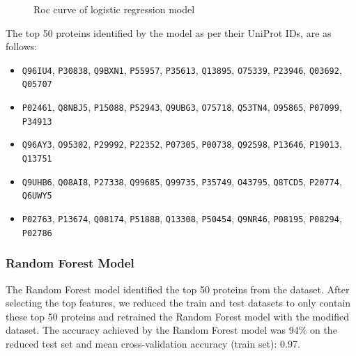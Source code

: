 \documentclass[a4paper,12pt]{article}
\begin{document}
\begin{figure}[H]
\begin{minipage}[b]{0.45\textwidth}
		\caption{Roc curve of logistic regression model}
		\label{fig:roc_curve_logreg}
	\end{minipage}
\end{figure}
The top 50 proteins identified by the model as per their UniProt IDs, are as follows:
\begin{itemize}
	\item \texttt{Q96IU4}, \texttt{P30838}, \texttt{Q9BXN1}, \texttt{P55957}, \texttt{P35613}, \texttt{Q13895}, \texttt{O75339}, \texttt{P23946}, \texttt{Q03692}, \texttt{Q05707}
	\item \texttt{P02461}, \texttt{Q8NBJ5}, \texttt{P15088}, \texttt{P52943}, \texttt{Q9UBG3}, \texttt{O75718}, \texttt{Q53TN4}, \texttt{O95865}, \texttt{P07099}, \texttt{P34913}
	\item \texttt{Q96AY3}, \texttt{O95302}, \texttt{P29992}, \texttt{P22352}, \texttt{P07305}, \texttt{P00738}, \texttt{Q92598}, \texttt{P13646}, \texttt{P19013}, \texttt{Q13751}
	\item \texttt{Q9UHB6}, \texttt{Q08AI8}, \texttt{P27338}, \texttt{Q99685}, \texttt{Q99735}, \texttt{P35749}, \texttt{O43795}, \texttt{Q8TCD5}, \texttt{P20774}, \texttt{Q6UWY5}
	\item \texttt{P02763}, \texttt{P13674}, \texttt{Q08174}, \texttt{P51888}, \texttt{Q13308}, \texttt{P50454}, \texttt{Q9NR46}, \texttt{P08195}, \texttt{P08294}, \texttt{P02786}
\end{itemize}


\subsubsection{Random Forest Model}
The Random Forest model identified the top 50 proteins from the dataset. After selecting the top features, we reduced the train and test datasets to only contain these top 50 proteins and retrained the Random Forest model with the modified dataset. The accuracy achieved by the Random Forest model was 94\% on the reduced test set and mean cross-validation accuracy (train set): 0.97.
\end{document}

